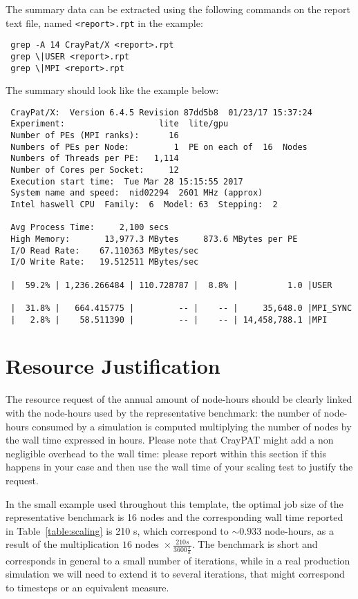 \documentclass[11pt]{article}
\begin{document}
The summary data can be extracted using the following commands on the report text file, named \verb!<report>.rpt! in the example:
\begin{verbatim}
 grep -A 14 CrayPat/X <report>.rpt
 grep \|USER <report>.rpt
 grep \|MPI <report>.rpt
\end{verbatim}

The summary should look like the example below: 
\begin{verbatim}
 CrayPat/X:  Version 6.4.5 Revision 87dd5b8  01/23/17 15:37:24
 Experiment:                   lite  lite/gpu     
 Number of PEs (MPI ranks):      16
 Numbers of PEs per Node:         1  PE on each of  16  Nodes
 Numbers of Threads per PE:   1,114
 Number of Cores per Socket:     12
 Execution start time:  Tue Mar 28 15:15:55 2017
 System name and speed:  nid02294  2601 MHz (approx)
 Intel haswell CPU  Family:  6  Model: 63  Stepping:  2
 
 Avg Process Time:     2,100 secs             
 High Memory:       13,977.3 MBytes     873.6 MBytes per PE
 I/O Read Rate:    67.110363 MBytes/sec       
 I/O Write Rate:   19.512511 MBytes/sec
 
 |  59.2% | 1,236.266484 | 110.728787 |  8.8% |          1.0 |USER
 
 |  31.8% |   664.415775 |         -- |    -- |     35,648.0 |MPI_SYNC
 |   2.8% |    58.511390 |         -- |    -- | 14,458,788.1 |MPI
\end{verbatim}

\section{Resource Justification}
The resource request of the annual amount of node-hours should be clearly linked with the node-hours used 
by the representative benchmark: the number of node-hours consumed by a simulation is computed multiplying 
the number of nodes by the wall time expressed in hours. 
Please note that CrayPAT might add a non negligible overhead to the wall time: please report within this section 
if this happens in your case and then use the wall time of your scaling test to justify the request.

In the small example used throughout this template, the optimal job size of the representative benchmark is 16 nodes and 
the corresponding wall time reported in Table~\ref{table:scaling} is 210 s, which correspond to $\sim 0.933$ node-hours, 
as a result of the multiplication $16 \mbox { nodes } \times \frac{210 s}{3600 \frac{s}{h}}$. 
The benchmark is short and corresponds in general to a small number of iterations, while in a real production simulation 
we will need to extend it to several iterations, that might correspond to timesteps or an equivalent measure. 
\end{document}
